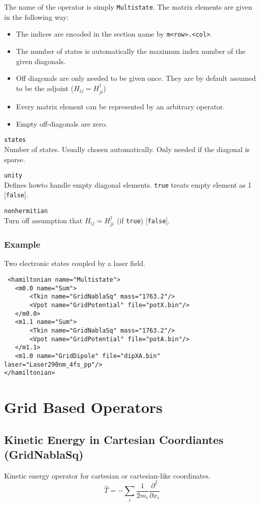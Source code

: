 \documentclass[a4paper,12pt]{scrbook}
\newcommand{\option}[2]{\item \texttt{#1}\\ #2}
\newcommand{\code}[1]{\texttt{#1}}
\begin{document}
The name of the operator is simply \verb|Multistate|. The matrix elements are given in the following way:
\begin{itemize}
 \item The indices are encoded in the section name by \verb|m<row>.<col>|.
 \item The number of states is automatically the maximum index number of the given diagonals.
 \item Off diagonals are only needed to be given once. They are by default assumed to be the adjoint ($H_{ij} = H_{ji}^\dagger$)
 \item Every matrix element can be represented by an arbitrary operator.
 \item Empty off-diagonals are zero.
\end{itemize}

\begin{options}
 \option{states}{Number of states. Usually chosen automatically. Only needed if the diagonal is sparse.}
 \option{unity}{Defines howto handle empty diagonal elements. \code{true} treats empty element as 1 [\code{false}].}
 \option{nonhermitian}{Turn off assumption that $H_{ij} = H_{ji}^\dagger$ (if \code{true}) [\code{false}].}
\end{options}


\subsubsection*{Example}
Two electronic states coupled by a laser field.
\begin{verbatim}
 <hamiltonian name="Multistate">
   <m0.0 name="Sum">
       <Tkin name="GridNablaSq" mass="1763.2"/>
       <Vpot name="GridPotential" file="potX.bin"/>
   </m0.0>
   <m1.1 name="Sum">
       <Tkin name="GridNablaSq" mass="1763.2"/>
       <Vpot name="GridPotential" file="potA.bin"/>
   </m1.1>
   <m1.0 name="GridDipole" file="dipXA.bin" laser="Laser290nm_4fs_pp"/>
</hamiltonian>
\end{verbatim}


\section{Grid Based Operators}

\subsection{Kinetic Energy in Cartesian Coordiantes (GridNablaSq)}
Kinetic energy operator for cartesian or cartesian-like coordinates.
\begin{equation}
 \hat T = -\sum_i \frac{1}{2m_i}\frac{\partial^2}{\partial x_i}
\end{equation}
\end{document}
